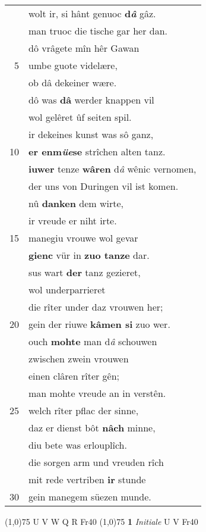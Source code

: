 \documentclass[8pt,a4paper,notitlepage]{article}
\begin{document}
\begin{table}[ht]
\begin{minipage}[t]{0.5\linewidth}
\begin{tabular}{rl}
 & wolt ir, si hânt genuoc \textbf{d\textit{â}} gâz.\\ 
 & man truoc die tische gar her dan.\\ 
 & dô vrâgete mîn hêr Gawan\\ 
5 & umbe guote videlære,\\ 
 & ob dâ dekeiner wære.\\ 
 & dô was \textbf{dâ} werder knappen vil\\ 
 & wol gelêret ûf seiten spil.\\ 
 & ir dekeines kunst was sô ganz,\\ 
10 & \textbf{er enm\textit{üe}se} strîchen alten tanz.\\ 
 & \textbf{iuwer} tenze \textbf{wâren} d\textit{â} wênic vernomen,\\ 
 & der uns von Duringen vil ist komen.\\ 
 & nû \textbf{danken} dem wirte,\\ 
 & ir vreude er niht irte.\\ 
15 & manegiu vrouwe wol gevar\\ 
 & \textbf{gienc} vür in \textbf{zuo tanze} dar.\\ 
 & sus wart \textbf{der} tanz gezieret,\\ 
 & wol underparrieret\\ 
 & die rîter under daz vrouwen her;\\ 
20 & gein der riuwe \textbf{kâmen si} zuo wer.\\ 
 & ouch \textbf{mohte} man d\textit{â} schouwen\\ 
 & zwischen zwein vrouwen\\ 
 & einen clâren rîter gên;\\ 
 & man mohte vreude an in verstên.\\ 
25 & welch rîter pflac der sinne,\\ 
 & daz er dienst bôt \textbf{nâch} minne,\\ 
 & diu bete was erlouplîch.\\ 
 & die sorgen arm und vreuden rîch\\ 
 & mit rede vertriben \textbf{ir} stunde\\ 
30 & gein manegem süezen munde.\\ 
\end{tabular}
\scriptsize
\line(1,0){75} \newline
U V W Q R Fr40 \newline
\line(1,0){75} \newline
\textbf{1} \textit{Initiale} U V Fr40  \newline

\end{minipage}
\end{table}
\end{document}
